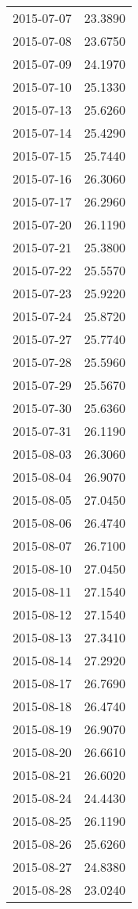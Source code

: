 \begin{tabular}{lr}
2015-07-07 &     23.3890 \\
2015-07-08 &     23.6750 \\
2015-07-09 &     24.1970 \\
2015-07-10 &     25.1330 \\
2015-07-13 &     25.6260 \\
2015-07-14 &     25.4290 \\
2015-07-15 &     25.7440 \\
2015-07-16 &     26.3060 \\
2015-07-17 &     26.2960 \\
2015-07-20 &     26.1190 \\
2015-07-21 &     25.3800 \\
2015-07-22 &     25.5570 \\
2015-07-23 &     25.9220 \\
2015-07-24 &     25.8720 \\
2015-07-27 &     25.7740 \\
2015-07-28 &     25.5960 \\
2015-07-29 &     25.5670 \\
2015-07-30 &     25.6360 \\
2015-07-31 &     26.1190 \\
2015-08-03 &     26.3060 \\
2015-08-04 &     26.9070 \\
2015-08-05 &     27.0450 \\
2015-08-06 &     26.4740 \\
2015-08-07 &     26.7100 \\
2015-08-10 &     27.0450 \\
2015-08-11 &     27.1540 \\
2015-08-12 &     27.1540 \\
2015-08-13 &     27.3410 \\
2015-08-14 &     27.2920 \\
2015-08-17 &     26.7690 \\
2015-08-18 &     26.4740 \\
2015-08-19 &     26.9070 \\
2015-08-20 &     26.6610 \\
2015-08-21 &     26.6020 \\
2015-08-24 &     24.4430 \\
2015-08-25 &     26.1190 \\
2015-08-26 &     25.6260 \\
2015-08-27 &     24.8380 \\
2015-08-28 &     23.0240 \\

\end{tabular}
